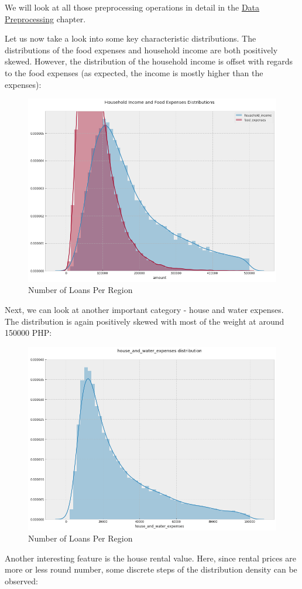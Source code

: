 \documentclass{article}
\begin{document}
We will look at all those preprocessing operations in detail in the \hyperlink{data_prep}{Data Preprocessing} chapter.

Let us now take a look into some key characteristic distributions. The distributions of the food expenses and household income are both positively skewed. However, the distribution of the household income is offset with regards to the food expenses (as expected, the income is mostly higher than the expenses):

\begin{figure}[H]
\caption{Number of Loans Per Region}
\centering
\includegraphics[width = 0.7 \textwidth]{house_inc_food_expenses_dist}
\end{figure}

Next, we can look at another important category - house and water expenses. The distribution is again positively skewed with most of the weight at around 150000 PHP:

\begin{figure}[H]
\caption{Number of Loans Per Region}
\centering
\includegraphics[width = 0.7 \textwidth]{house_water_expenses_dist}
\end{figure}

Another interesting feature is the house rental value. Here, since rental prices are more or less round number, some discrete steps of the distribution density can be observed:
\end{document}
